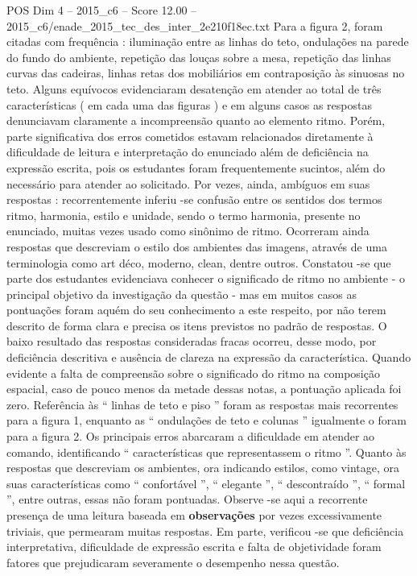 \begin{textsample}{POS Dim 4 – 2015\_c6 – Score 12.00 – 2015\_c6/enade\_2015\_tec\_des\_inter\_2e210f18ec.txt}
Para a figura 2, foram citadas com frequência : iluminação entre as linhas do teto, ondulações na parede do fundo do ambiente, repetição das louças sobre a mesa, repetição das linhas curvas das cadeiras, linhas retas dos mobiliários em contraposição às sinuosas no teto.
Alguns equívocos evidenciaram desatenção em atender ao total de três características ( em cada uma das figuras ) e em alguns casos as respostas denunciavam claramente a incompreensão quanto ao elemento ritmo.
Porém, parte significativa dos erros cometidos estavam relacionados diretamente à dificuldade de leitura e interpretação do enunciado além de deficiência na expressão escrita, pois os estudantes foram frequentemente sucintos, além do necessário para atender ao solicitado.
Por vezes, ainda, ambíguos em suas respostas : recorrentemente inferiu -se confusão entre os sentidos dos termos ritmo, harmonia, estilo e unidade, sendo o termo harmonia, presente no enunciado, muitas vezes usado como sinônimo de ritmo.
Ocorreram ainda respostas que descreviam o estilo dos ambientes das imagens, através de uma terminologia como art déco, moderno, clean, dentre outros.
Constatou -se que parte dos estudantes evidenciava conhecer o significado de ritmo no ambiente - o principal objetivo da investigação da questão - mas em muitos casos as pontuações foram aquém do seu conhecimento a este respeito, por não terem descrito de forma clara e precisa os itens previstos no padrão de respostas.
O baixo resultado das respostas consideradas fracas ocorreu, desse modo, por deficiência descritiva e ausência de clareza na expressão da característica.
Quando evidente a falta de compreensão sobre o significado do ritmo na composição espacial, caso de pouco menos da metade dessas notas, a pontuação aplicada foi zero.
Referência às “ linhas de teto e piso ” foram as respostas mais recorrentes para a figura 1, enquanto as “ ondulações de teto e colunas ” igualmente o foram para a figura 2.
Os principais erros abarcaram a dificuldade em atender ao comando, identificando “ características que representassem o ritmo ”.
Quanto às respostas que descreviam os ambientes, ora indicando estilos, como vintage, ora suas características como “ confortável ”, “ elegante ”, “ descontraído ”, “ formal ”, entre outras, essas não foram pontuadas.
Observe -se aqui a recorrente presença de uma leitura baseada em \textbf{observações} por vezes excessivamente triviais, que permearam muitas respostas.
Em parte, verificou -se que deficiência interpretativa, dificuldade de expressão escrita e falta de objetividade foram fatores que prejudicaram severamente o desempenho nessa questão.

\end{textsample}
